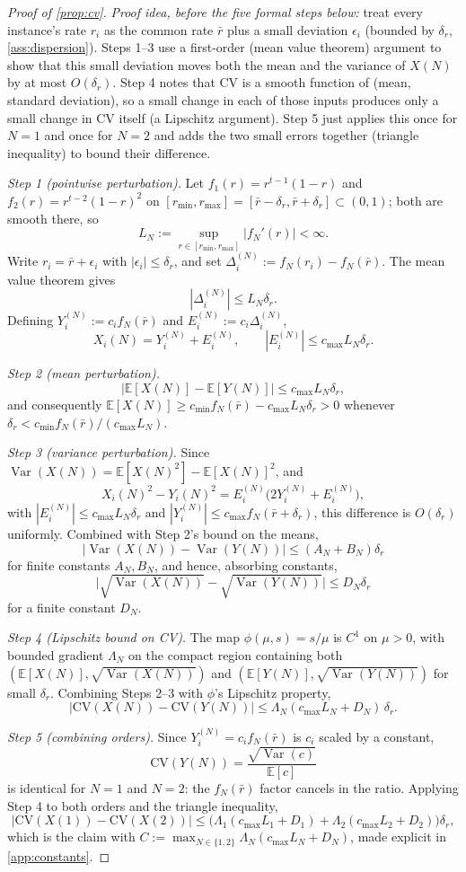 \documentclass{article}
\theoremstyle{plain}
\theoremstyle{definition}
\theoremstyle{remark}
\DeclareMathOperator{\Var}{Var}
\newcommand{\CV}{\mathrm{CV}}
\begin{document}
\begin{proof}[Proof of \cref{prop:cv}]
\emph{Proof idea, before the five formal steps below:} treat every instance's rate $r_i$ as the common rate $\bar r$ plus a small deviation $\epsilon_i$ (bounded by $\delta_r$, \cref{ass:dispersion}). Steps 1--3 use a first-order (mean value theorem) argument to show that this small deviation moves both the mean and the variance of $X(N)$ by at most $O(\delta_r)$. Step 4 notes that $\CV$ is a smooth function of (mean, standard deviation), so a small change in each of those inputs produces only a small change in $\CV$ itself (a Lipschitz argument). Step 5 just applies this once for $N=1$ and once for $N=2$ and adds the two small errors together (triangle inequality) to bound their difference.

\emph{Step 1 (pointwise perturbation).} Let $f_1(r)=r^{t-1}(1-r)$ and $f_2(r)=r^{t-2}(1-r)^2$ on $[r_{\min},r_{\max}]=[\bar r-\delta_r,\bar r+\delta_r]\subset(0,1)$; both are smooth there, so
\[
L_N := \sup_{r\in[r_{\min},r_{\max}]}|f_N'(r)| < \infty.
\]
Write $r_i=\bar r+\epsilon_i$ with $|\epsilon_i|\le\delta_r$, and set $\Delta_i^{(N)} := f_N(r_i)-f_N(\bar r)$. The mean value theorem gives
\[
|\Delta_i^{(N)}| \le L_N\delta_r.
\]
Defining $Y_i^{(N)} := c_i f_N(\bar r)$ and $E_i^{(N)} := c_i\Delta_i^{(N)}$,
\[
X_i(N) = Y_i^{(N)} + E_i^{(N)}, \qquad |E_i^{(N)}| \le c_{\max}L_N\delta_r.
\]

\emph{Step 2 (mean perturbation).}
\[
|\mathbb E[X(N)]-\mathbb E[Y(N)]| \le c_{\max}L_N\delta_r,
\]
and consequently $\mathbb E[X(N)] \ge c_{\min}f_N(\bar r) - c_{\max}L_N\delta_r > 0$ whenever $\delta_r < c_{\min}f_N(\bar r)/(c_{\max}L_N)$.

\emph{Step 3 (variance perturbation).} Since $\Var(X(N)) = \mathbb E[X(N)^2] - \mathbb E[X(N)]^2$, and
\[
X_i(N)^2 - Y_i(N)^2 = E_i^{(N)}\big(2Y_i^{(N)} + E_i^{(N)}\big),
\]
with $|E_i^{(N)}|\le c_{\max}L_N\delta_r$ and $|Y_i^{(N)}|\le c_{\max}f_N(\bar r+\delta_r)$, this difference is $O(\delta_r)$ uniformly. Combined with Step 2's bound on the means,
\[
|\Var(X(N)) - \Var(Y(N))| \le (A_N+B_N)\delta_r
\]
for finite constants $A_N,B_N$, and hence, absorbing constants,
\[
\big|\sqrt{\Var(X(N))} - \sqrt{\Var(Y(N))}\big| \le D_N\delta_r
\]
for a finite constant $D_N$.

\emph{Step 4 (Lipschitz bound on CV).} The map $\phi(\mu,s)=s/\mu$ is $C^1$ on $\mu>0$, with bounded gradient $\Lambda_N$ on the compact region containing both $(\mathbb E[X(N)],\sqrt{\Var(X(N))})$ and $(\mathbb E[Y(N)],\sqrt{\Var(Y(N))})$ for small $\delta_r$. Combining Steps 2--3 with $\phi$'s Lipschitz property,
\[
|\CV(X(N)) - \CV(Y(N))| \le \Lambda_N(c_{\max}L_N + D_N)\,\delta_r.
\]

\emph{Step 5 (combining orders).} Since $Y_i^{(N)} = c_i f_N(\bar r)$ is $c_i$ scaled by a constant,
\[
\CV(Y(N)) = \frac{\sqrt{\Var(c)}}{\mathbb E[c]}
\]
is identical for $N=1$ and $N=2$: the $f_N(\bar r)$ factor cancels in the ratio. Applying Step 4 to both orders and the triangle inequality,
\[
|\CV(X(1)) - \CV(X(2))| \le \big(\Lambda_1(c_{\max}L_1+D_1) + \Lambda_2(c_{\max}L_2+D_2)\big)\delta_r,
\]
which is the claim with $C := \max_{N\in\{1,2\}}\Lambda_N(c_{\max}L_N+D_N)$, made explicit in \cref{app:constants}.
\end{proof}
\end{document}
